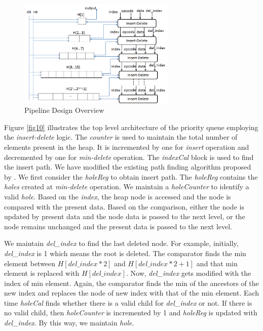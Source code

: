 \documentclass[10pt, conference, compsocconf]{IEEEtran}
\begin{document}
\begin{figure}[!ht]
  \centering
  \includegraphics[width=7.5cm]{Figures/1.png}
      \caption{Pipeline Design Overview}
    \label{fig11}
\end{figure}

Figure \ref{fig10} illustrates the top level architecture of the priority queue employing the {\it insert-delete} logic.
The {\it counter} is used to maintain the total number of elements present in the heap.
It is incremented by one for {\it insert} operation and decremented by one for {\it min-delete} operation.
The {\it indexCal} block is used to find the insert path.
We have modified the existing path finding algorithm proposed by \cite{pq6}.
We first consider the {\it holeReg} to obtain insert path.
The {\it holeReg} contains the {\it holes} created at {\it min-delete} operation.
We maintain a {\it holeCounter} to identify a valid {\it hole}.
Based on the {\it index}, the heap node is accessed and the node is compared with the present data.
Based on the comparison, either the node is updated by present data and the node data is passed to the next level, or the node remains unchanged and the present data is passed to the next level.

We maintain {\it del\_index} to find the last deleted node.
For example, initially, {\it del\_index} is 1 which means the root is deleted.
The comparator finds the min element between $H[del\_index*2]$ and $H[del\_index*2 + 1]$ and that min element is replaced with $H[del\_index]$.
Now, {\it del\_index} gets modified with the index of min element.
Again, the comparator finds the min of the ancestors of the new index and replaces the node of new index with that of the min element.
Each time {\it holeCal} finds whether there is a valid child for {\it del\_index} or not.
If there is no valid child, then {\it holeCounter} is incremented by 1 and {\it holeReg} is updated with {\it del\_index}. By this way, we maintain {\it hole}.
\end{document}
